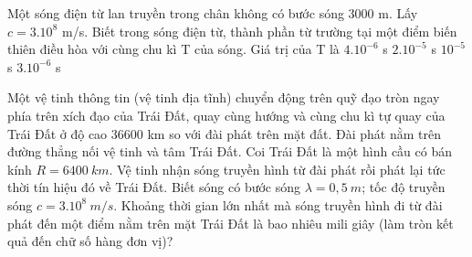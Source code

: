 \begin{vidu} %
 Một sóng điện từ lan truyền trong chân không có bước sóng 3000 m. Lấy $c=3.10^8$ m/s. Biết trong sóng điện từ, thành phần từ trường tại một điểm biến thiên điều hòa với cùng chu kì T của sóng. Giá trị của T là
\choice
{$4.10^{-6}$ s}
{$2.10^{-5}$ s}
{\True $10^{-5}$ s}
{$3.10^{-6}$ s}
\end{vidu} 

\begin{vidu}
Một vệ tinh thông tin (vệ tinh địa tĩnh) chuyển động trên quỹ đạo tròn ngay phía trên xích đạo của Trái Đất, quay cùng hướng và cùng chu kì tự quay của Trái Đất ở độ cao 36600 km so với đài phát trên mặt đất. Đài phát nằm trên đường thẳng nối vệ tinh và tâm Trái Đất. Coi Trái Đất là một hình cầu có bán kính $R=6400\ km$. Vệ tinh nhận sóng truyền hình từ đài phát rồi phát lại tức thời tín hiệu đó về Trái Đất. Biết sóng có bước sóng $\lambda=0,5\ m$; tốc độ truyền sóng $c=3.10^8\ m/s$. Khoảng thời gian lớn nhất mà sóng truyền hình đi từ đài phát đến một điểm nằm trên mặt Trái Đất là bao nhiêu mili giây (làm tròn kết quả đến chữ số hàng đơn vị)?
\end{vidu} 

